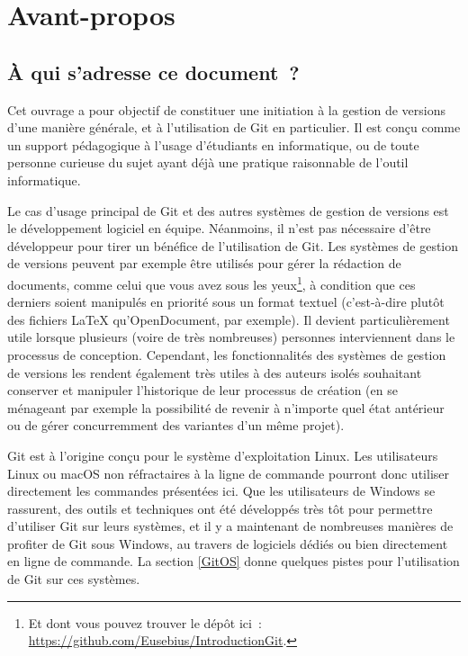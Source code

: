 \chapter*{Avant-propos}\label{chapAvantPropos}
\thispagestyle{empty}

\section*{À qui s'adresse ce document~?}

Cet ouvrage a pour objectif de constituer une initiation à la gestion
de versions d'une manière générale, et à l'utilisation de Git en
particulier. Il est conçu comme un support pédagogique à l'usage
d'étudiants en informatique, ou de toute personne curieuse du sujet
ayant déjà une pratique raisonnable de l'outil informatique.

Le cas d'usage principal de Git et des autres systèmes de gestion de
versions est le développement logiciel en équipe. Néanmoins, il n'est
pas nécessaire d'être développeur pour tirer un bénéfice de
l'utilisation de Git. Les systèmes de gestion de versions peuvent par
exemple être utilisés pour gérer la rédaction de documents, comme
celui que vous avez sous les yeux\footnote{Et dont vous pouvez trouver
  le dépôt ici~: \url{https://github.com/Eusebius/IntroductionGit}.},
à condition que ces derniers soient manipulés en priorité sous un
format textuel (c'est-à-dire plutôt des fichiers \LaTeX
qu'OpenDocument, par exemple). Il devient particulièrement utile
lorsque plusieurs (voire de très nombreuses) personnes interviennent
dans le processus de conception. Cependant, les fonctionnalités des
systèmes de gestion de versions les rendent également très utiles à
des auteurs isolés souhaitant conserver et manipuler l'historique de
leur processus de création (en se ménageant par exemple la possibilité
de revenir à n'importe quel état antérieur ou de gérer concurremment
des variantes d'un même projet).

Git est à l'origine conçu pour le système d'exploitation Linux. Les
utilisateurs Linux ou macOS non réfractaires à la ligne de commande
pourront donc utiliser directement les commandes présentées ici. Que
les utilisateurs de Windows se rassurent, des outils et techniques ont
été développés très tôt pour permettre d'utiliser Git sur leurs
systèmes, et il y a maintenant de nombreuses manières de profiter de
Git sous Windows, au travers de logiciels dédiés ou bien directement
en ligne de commande. La section \ref{GitOS} donne quelques pistes
pour l'utilisation de Git sur ces systèmes.

